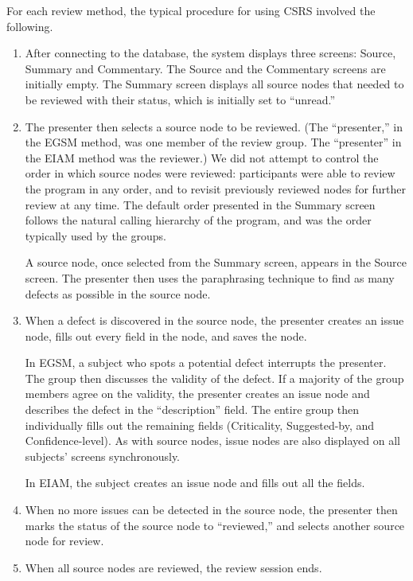 For each review method, the typical procedure for using CSRS 
involved the following.

\begin{enumerate}
  
\item After connecting to the database, the system displays three screens:
  Source, Summary and Commentary.  The Source and the Commentary screens
  are initially empty.  The Summary screen displays all source nodes that
  needed to be reviewed with their status, which is initially set to
  ``unread.''
  
\item The presenter then selects a source node to be reviewed. (The
  ``presenter,'' in the EGSM method, was one member of the review group.
  The ``presenter'' in the EIAM method was the reviewer.)  We did
  not attempt to control the order in which source nodes were reviewed:
  participants were able to review the program in any order, and to revisit
  previously reviewed nodes for further review at any time.  The default
  order presented in the Summary screen follows the natural calling
  hierarchy of the program, and was the order typically used by the groups.

  
  A source node, once selected from the Summary screen, appears in the
  Source screen. The presenter then uses the paraphrasing technique
  to find as many defects as possible in the source node.
  
  
\item When a defect is discovered in the source node, the presenter creates
  an issue node, fills out every field in the node, and saves the node.
  
  In EGSM, a subject who spots a potential defect interrupts the
  presenter. The group then discusses the validity of the defect.  If a
  majority of the group members agree on the validity, the presenter
  creates an issue node and describes the defect in the ``description''
  field. The entire group then individually fills out the remaining fields
  (Criticality, Suggested-by, and Confidence-level).  As with source nodes,
  issue nodes are also displayed on all subjects' screens synchronously.

  In EIAM, the subject creates an issue node and fills out all the fields.
  
\item When no more issues can be detected in the source node, the presenter
  then marks the status of the source node to ``reviewed,'' and selects
  another source node for review.

\item When all source nodes are reviewed, the review session ends. 

\end{enumerate}




